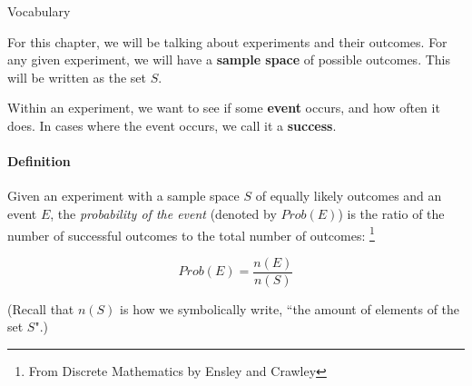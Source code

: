 \documentclass[a4paper,12pt]{book}
\begin{document}
        \begin{intro}{Vocabulary}

            For this chapter, we will be talking about experiments and their outcomes.
            For any given experiment, we will have a \textbf{sample space} of possible
            outcomes. This will be written as the set $S$.

            Within an experiment, we want to see if some \textbf{event} occurs,
            and how often it does. In cases where the event occurs, we call
            it a \textbf{success}.

            \paragraph{Definition}
            Given an experiment with a sample space $S$ of equally likely
            outcomes and an event $E$, the \textit{probability of the event}
            (denoted by $Prob(E)$) is the ratio of the number of successful
            outcomes to the total number of outcomes:
            \footnote{From Discrete Mathematics by Ensley and Crawley}

            $$Prob(E) = \frac{n(E)}{n(S)}$$

            (Recall that $n(S)$ is how we symbolically write, ``the amount
            of elements of the set $S$".)
        \end{intro}
\end{document}
